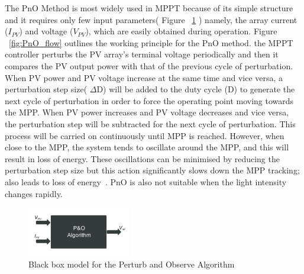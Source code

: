 {  
  The \ac{PnO} Method is most widely used in \ac{MPPT} because of  its simple structure and it requires only few input parameters( Figure ~\ref{fig:PnO_block} ) namely, the array current ($I_{PV}$) and voltage ($ V_{PV}$), which are easily obtained during operation. Figure ~\ref{fig:PnO_flow} outlines the working principle for the \ac{PnO} method. the \ac{MPPT}  controller perturbs the \ac{PV} array's terminal voltage periodically and then it compares the \ac{PV} output power with that of the previous cycle of perturbation. When \ac{PV} power and \ac{PV} voltage increase at the same time and vice versa, a perturbation step size( ${\Delta}$D) will be added to the duty cycle (D) to generate the next cycle of   perturbation in order to force the operating point moving towards the \ac{MPP}. When \ac{PV} power increases and \ac{PV} voltage decreases and vice versa, the perturbation step will be subtracted for the next cycle of perturbation. This process will be carried on continuously until \ac{MPP} is reached. However, when close to the \ac{MPP}, the system tends to oscillate around the \ac{MPP}, and this will result in loss of energy. These oscillations can be minimised by reducing the perturbation step size but this action significantly slows down the \ac{MPP} tracking; also leads to loss of energy~\cite{ngan2011study}. \ac{PnO} is also not suitable when the light intensity changes rapidly.\\ %
    \begin{figure}[H]
         \begin{center}
         \includegraphics[width=0.4\textwidth]{images/PnO_block}
         \caption{ Black box model for the Perturb and Observe Algorithm }
         \label{fig:PnO_block}
         \end{center}
         \end{figure}
         
}
